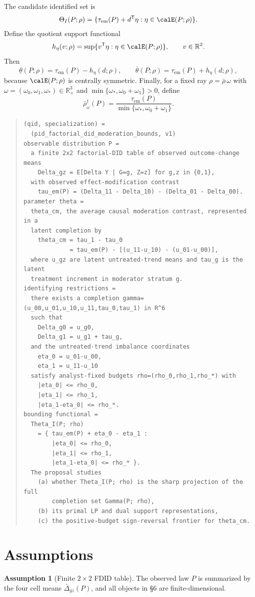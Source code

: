 \documentclass[11pt]{article}
\newcommand{\transpose}{\mathsf{T}}
\newcommand{\R}{\mathbb{R}}
\theoremstyle{definition}
\newtheorem{assumption}{Assumption}
\theoremstyle{plain}
\theoremstyle{remark}
\begin{document}
The candidate identified set is
\[
\Theta_I(P;\rho)=
\{\tau_{\mathrm{em}}(P)+d^\transpose\eta:\eta\in\calE(P;\rho)\}.
\]
Define the quotient support functional
\[
h_\eta(v;\rho)=\sup\{v^\transpose\eta:\eta\in\calE(P;\rho)\},
\qquad v\in\R^2.
\]
Then
\[
\underline\theta(P;\rho)=\tau_{\mathrm{em}}(P)-h_\eta(d;\rho),
\qquad
\overline\theta(P;\rho)=\tau_{\mathrm{em}}(P)+h_\eta(d;\rho),
\]
because \(\calE(P;\rho)\) is centrally symmetric. Finally, for a fixed ray \(\rho=\bar\rho\,\omega\) with \(\omega=(\omega_0,\omega_1,\omega_\ast)\in\R_+^3\) and \(\min\{\omega_\ast,\omega_0+\omega_1\}>0\), define
\[
\bar\rho^\dagger_\omega(P)=
\frac{\tau_{\mathrm{em}}(P)}{\min\{\omega_\ast,\omega_0+\omega_1\}}.
\]

\begin{quote}
\begin{verbatim}
(qid, specialization) =
  (pid_factorial_did_moderation_bounds, v1)
observable distribution P =
  a finite 2x2 factorial-DID table of observed outcome-change means
    Delta_gz = E[Delta Y | G=g, Z=z] for g,z in {0,1},
  with observed effect-modification contrast
    tau_em(P) = (Delta_11 - Delta_10) - (Delta_01 - Delta_00).
parameter theta =
  theta_cm, the average causal moderation contrast, represented in a
  latent completion by
    theta_cm = tau_1 - tau_0
             = tau_em(P) - [(u_11-u_10) - (u_01-u_00)],
  where u_gz are latent untreated-trend means and tau_g is the latent
  treatment increment in moderator stratum g.
identifying restrictions =
  there exists a completion gamma=(u_00,u_01,u_10,u_11,tau_0,tau_1) in R^6
  such that
    Delta_g0 = u_g0,
    Delta_g1 = u_g1 + tau_g,
  and the untreated-trend imbalance coordinates
    eta_0 = u_01-u_00,
    eta_1 = u_11-u_10
  satisfy analyst-fixed budgets rho=(rho_0,rho_1,rho_*) with
    |eta_0| <= rho_0,
    |eta_1| <= rho_1,
    |eta_1-eta_0| <= rho_*.
bounding functional =
  Theta_I(P; rho)
    = { tau_em(P) + eta_0 - eta_1 :
        |eta_0| <= rho_0,
        |eta_1| <= rho_1,
        |eta_1-eta_0| <= rho_* }.
  The proposal studies
    (a) whether Theta_I(P; rho) is the sharp projection of the full
        completion set Gamma(P; rho),
    (b) its primal LP and dual support representations,
    (c) the positive-budget sign-reversal frontier for theta_cm.
\end{verbatim}
\end{quote}

\section{Assumptions}
\begin{assumption}[Finite \(2\times 2\) FDID table]\label{ass:finite-design}
The observed law \(P\) is summarized by the four cell means \(\bar\Delta_{gz}(P)\), and all objects in \S6 are finite-dimensional.
\end{assumption}
\end{document}
